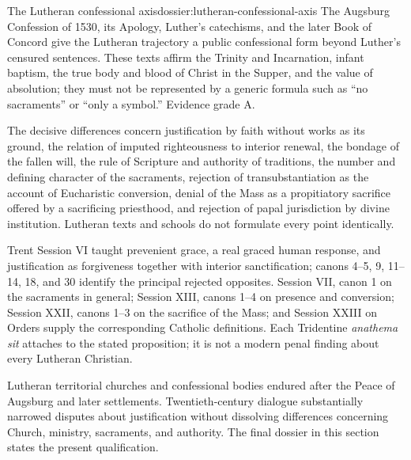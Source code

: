 \begin{heresydossier}{The Lutheran confessional axis}{dossier:lutheran-confessional-axis}
\objectfield The Augsburg Confession of 1530, its Apology, Luther's catechisms, and the later Book of Concord give the Lutheran trajectory a public confessional form beyond Luther's censured sentences. These texts affirm the Trinity and Incarnation, infant baptism, the true body and blood of Christ in the Supper, and the value of absolution; they must not be represented by a generic formula such as ``no sacraments'' or ``only a symbol.'' Evidence grade A.

\propositionfield The decisive differences concern justification by faith without works as its ground, the relation of imputed righteousness to interior renewal, the bondage of the fallen will, the rule of Scripture and authority of traditions, the number and defining character of the sacraments, rejection of transubstantiation as the account of Eucharistic conversion, denial of the Mass as a propitiatory sacrifice offered by a sacrificing priesthood, and rejection of papal jurisdiction by divine institution. Lutheran texts and schools do not formulate every point identically.

\responsefield Trent Session VI taught prevenient grace, a real graced human response, and justification as forgiveness together with interior sanctification; canons 4--5, 9, 11--14, 18, and 30 identify the principal rejected opposites. Session VII, canon 1 on the sacraments in general; Session XIII, canons 1--4 on presence and conversion; Session XXII, canons 1--3 on the sacrifice of the Mass; and Session XXIII on Orders supply the corresponding Catholic definitions. Each Tridentine \emph{anathema sit} attaches to the stated proposition; it is not a modern penal finding about every Lutheran Christian.

\aftermathfield Lutheran territorial churches and confessional bodies endured after the Peace of Augsburg and later settlements. Twentieth-century dialogue substantially narrowed disputes about justification without dissolving differences concerning Church, ministry, sacraments, and authority. The final dossier in this section states the present qualification.
\end{heresydossier}

